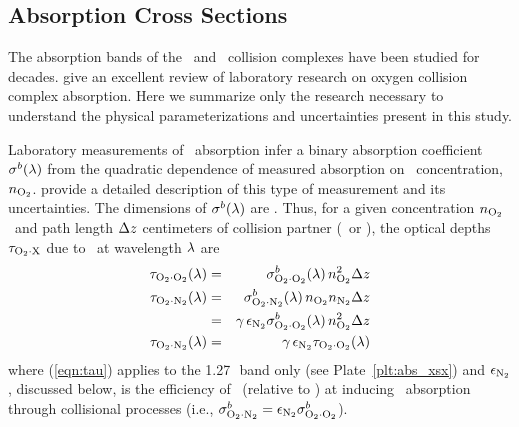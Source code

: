 \documentclass[agupp,twoside]{aguplus} %
\begin{document}
\subsection{Absorption Cross Sections}\label{sxn:xsx} 
The absorption bands of the \OdOd\ and \OdNd\ collision complexes have
been studied for decades.
\cite{SPS98} give an excellent review of laboratory research on
oxygen collision complex absorption.
Here we summarize only the research necessary to understand the  
physical parameterizations and uncertainties present in this
study. 

Laboratory measurements of \OdX\ absorption infer a binary absorption
coefficient $\sigma^{b}(\lambda)$ from the quadratic dependence of measured
absorption on \Od\ concentration, $n_{\mathrm{O}_{2}}$. 
\cite{NeB98} provide a detailed description of this type of
measurement and its uncertainties.
The dimensions of $\sigma^{b}(\lambda)$ are \cmFxmlcS.
Thus, for a given concentration $n_{\mathrm{O}_{2}}$\,\mlcxcmC\ and path length
$\Delta z$ centimeters of collision partner (\Od\ or \Nd), the optical
depths $\tau_{\mathrm{O}_{2} \cdot \mathrm{X}}$ due to \OdX\ at wavelength $\lambda$ are
\begin{eqnarray}
\odxcOdOd(\wvl) & = & \xsxbOdOd(\wvl) \, \cncOd^2 \pthdlt \\
\odxcOdNd(\wvl) & = & \xsxbOdNd(\wvl) \, \cncOd \cncNd \pthdlt \nonumber \\
& = & \gamma \, \epsNd \xsxbOdOd(\wvl) \, \cncOd^2 \pthdlt \nonumber \\
\odxcOdNd(\wvl) & = & \gamma \, \epsNd \odxcOdOd(\wvl)
\label{eqn:tau}
\end{eqnarray}
where (\ref{eqn:tau}) applies to the 1.27\,\um\ band only
(see Plate~\ref{plt:abs_xsx}) and $\epsilon_{\mathrm{N}_{2}}$, discussed below, 
is the efficiency of \Nd\ (relative to \Od) at inducing \Od\
absorption through collisional processes (i.e., $\sigma^{b}_{\mathrm{O}_{2} \cdot \mathrm{N}_{2}} = \epsilon_{\mathrm{N}_{2}}
\sigma^{b}_{\mathrm{O}_{2} \cdot \mathrm{O}_{2}}$). 
\end{document}
